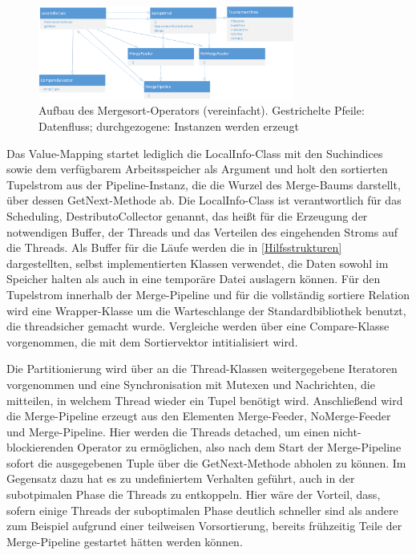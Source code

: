 \documentclass[a4paper,12pt,twoside]{article}
\begin{document}
\begin{figure}
	\centering
	\includegraphics[width=0.75\textwidth]{Bilder/sortmerge.png}
	\caption{Aufbau des Mergesort-Operators (vereinfacht). Gestrichelte Pfeile: Datenfluss; durchgezogene: Instanzen werden erzeugt}
	\label{img:KlassSort}
\end{figure}


Das Value-Mapping startet lediglich die LocalInfo-Class mit den Suchindices sowie dem verfügbarem Arbeitsspeicher als Argument und holt den sortierten Tupelstrom aus der Pipeline-Instanz, die die Wurzel des Merge-Baums darstellt, über dessen GetNext-Methode ab. Die LocalInfo-Class ist verantwortlich für das Scheduling, DestributoCollector genannt, das heißt für die Erzeugung der notwendigen Buffer, der Threads und das Verteilen des eingehenden Stroms auf die Threads. Als Buffer für die Läufe werden die in \autoref{Hilfsstrukturen} dargestellten, selbst implementierten Klassen verwendet, die Daten sowohl im Speicher halten als auch in eine temporäre Datei auslagern können. Für den Tupelstrom innerhalb der Merge-Pipeline und für die vollständig sortiere Relation wird eine Wrapper-Klasse um die Warteschlange der Standardbibliothek benutzt, die threadsicher gemacht wurde. Vergleiche werden über eine Compare-Klasse vorgenommen, die mit dem Sortiervektor intitialisiert wird.

Die Partitionierung wird über an die Thread-Klassen weitergegebene Iteratoren vorgenommen und eine Synchronisation mit Mutexen und Nachrichten, die mitteilen, in welchem Thread wieder ein Tupel benötigt wird. Anschließend wird die Merge-Pipeline erzeugt aus den Elementen Merge-Feeder, NoMerge-Feeder und Merge-Pipeline. Hier werden die Threads detached, um einen nicht-blockierenden Operator zu ermöglichen, also nach dem Start der Merge-Pipeline sofort die ausgegebenen Tuple über die GetNext-Methode abholen zu können. Im Gegensatz dazu hat es zu undefiniertem Verhalten geführt, auch in der subotpimalen Phase die Threads zu entkoppeln. Hier wäre der Vorteil, dass, sofern einige Threads der suboptimalen Phase deutlich schneller sind als andere zum Beispiel aufgrund einer teilweisen Vorsortierung, bereits frühzeitig Teile der Merge-Pipeline gestartet hätten werden können.
\end{document}
